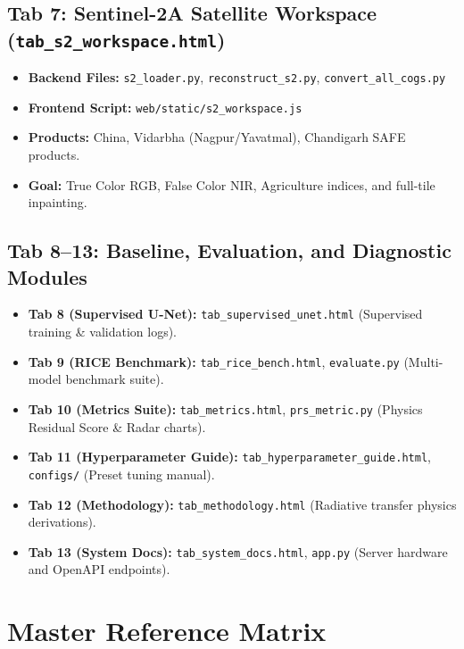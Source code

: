 \documentclass[11pt,a4paper]{article}
\begin{document}
\subsection{Tab 7: Sentinel-2A Satellite Workspace (\texttt{tab\_s2\_workspace.html})}
\begin{itemize}[noitemsep]
    \item \textbf{Backend Files:} \texttt{s2\_loader.py}, \texttt{reconstruct\_s2.py}, \texttt{convert\_all\_cogs.py}
    \item \textbf{Frontend Script:} \texttt{web/static/s2\_workspace.js}
    \item \textbf{Products:} China, Vidarbha (Nagpur/Yavatmal), Chandigarh SAFE products.
    \item \textbf{Goal:} True Color RGB, False Color NIR, Agriculture indices, and full-tile inpainting.
\end{itemize}

\subsection{Tab 8--13: Baseline, Evaluation, and Diagnostic Modules}
\begin{itemize}[noitemsep]
    \item \textbf{Tab 8 (Supervised U-Net):} \texttt{tab\_supervised\_unet.html} (Supervised training \& validation logs).
    \item \textbf{Tab 9 (RICE Benchmark):} \texttt{tab\_rice\_bench.html}, \texttt{evaluate.py} (Multi-model benchmark suite).
    \item \textbf{Tab 10 (Metrics Suite):} \texttt{tab\_metrics.html}, \texttt{prs\_metric.py} (Physics Residual Score \& Radar charts).
    \item \textbf{Tab 11 (Hyperparameter Guide):} \texttt{tab\_hyperparameter\_guide.html}, \texttt{configs/} (Preset tuning manual).
    \item \textbf{Tab 12 (Methodology):} \texttt{tab\_methodology.html} (Radiative transfer physics derivations).
    \item \textbf{Tab 13 (System Docs):} \texttt{tab\_system\_docs.html}, \texttt{app.py} (Server hardware and OpenAPI endpoints).
\end{itemize}

\newpage
\section{Master Reference Matrix}
\end{document}
